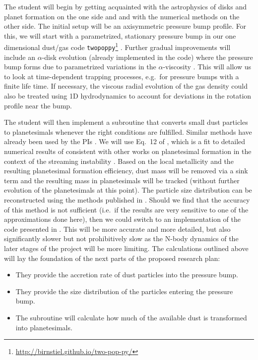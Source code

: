 \documentclass[10pt,fleqn,twoside]{article}
\newcommand{\twopoppy}{\texttt{twopoppy}\xspace}
\begin{document}
The student will begin by getting acquainted with the astrophysics of
disks and planet formation on the one side and and with the numerical
methods on the other side. The initial setup will be an axisymmetric
pressure bump profile. For this, we will start with a parametrized,
stationary pressure bump in our one dimensional dust/gas code
\twopoppy\footnote{\url{http://birnstiel.github.io/two-pop-py/}}
\citep{2012A&A...539A.148B}. Further gradual improvements will include
an $\alpha$-disk evolution (already implemented in the code) where the
pressure bump forms due to parametrized variations in the
$\alpha$-viscosity \citep{2007ApJ...664L..55K}. This will allow us to
look at time-dependent trapping processes, e.g.\ for pressure bumps
with a finite life time. If necessary, the viscous radial evolution of
the gas density could also be treated using 1D hydrodynamics to
account for deviations in the rotation profile near the bump.

The student will then implement a subroutine that converts small dust
particles to planetesimals whenever the right conditions are
fulfilled. Similar methods have already been used by the PIs
\citep[][and Klahr, Birnstiel, Lenz, in prep.]{2014A&A...572A..78D}.
We will use Eq.~12 of \citet{2014A&A...572A..78D}, which is a fit to
detailed numerical results of \citet{2010ApJ...722.1437B} consistent
with other works on planetesimal formation in the context of the
streaming instability \citep[e.g.,][]{2009ApJ...704L..75J}. Based on
the local metallicity and the resulting planetesimal formation
efficiency, dust mass will be removed via a sink term and the
resulting mass in planetesimals will be tracked (without further
evolution of the planetesimals at this point). The particle size
distribution can be reconstructed using the methods published in
\citet{2015ApJ...813L..14B}. Should we find that the accuracy of this
method is not sufficient (i.e.\ if the results are very sensitive to
one of the approximations done here), then we could switch to an
implementation of the code presented in \citet{2010A&A...513A..79B}.
This will be more accurate and more detailed, but also significantly
slower but not prohibitively slow as the N-body dynamics of the later
stages of the project will be more limiting. The calculations outlined
above will lay the foundation of the next parts of the proposed
research plan:

\begin{itemize}
  \item They provide the accretion rate of dust particles into
  the pressure bump.
  \item They provide the size distribution of the particles entering
  the pressure bump.
  \item The subroutine will calculate how much of the available dust
  is transformed into planetesimals.
\end{itemize}
\end{document}
